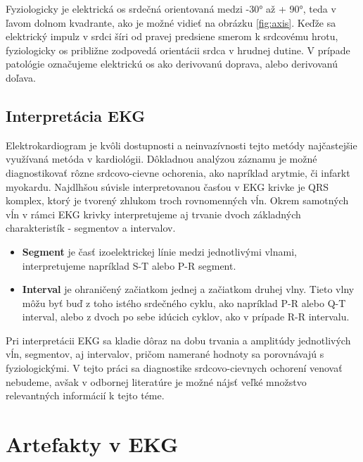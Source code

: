 Fyziologicky je elektrická os srdečná orientovaná medzi -30° až + 90°, teda v ľavom dolnom kvadrante, ako je možné vidieť na obrázku \ref{fig:axis}. Keďže sa elektrický impulz v srdci šíri od pravej predsiene smerom k srdcovému hrotu, fyziologicky os približne zodpovedá orientácii srdca v hrudnej dutine.\cite{Bada2010} V prípade patológie označujeme elektrickú os ako derivovanú doprava, alebo derivovanú doľava.

\subsection{Interpretácia EKG}

Elektrokardiogram je kvôli dostupnosti a neinvazívnosti tejto metódy najčastejšie využívaná metóda v kardiológii. Dôkladnou analýzou záznamu je možné diagnostikovať rôzne srdcovo-cievne ochorenia, ako napríklad arytmie, či infarkt myokardu. Najdlhšou súvisle interpretovanou časťou v EKG krivke je QRS komplex, ktorý je tvorený zhlukom troch rovnomenných vĺn. Okrem samotných vĺn v rámci EKG krivky interpretujeme aj trvanie dvoch základných charakteristík - segmentov a intervalov.
\begin{itemize}
    \item \textbf{Segment} je časť izoelektrickej línie medzi jednotlivými vlnami, interpretujeme napríklad S-T alebo P-R segment.
    \item \textbf{Interval} je ohraničený začiatkom jednej a začiatkom druhej vlny. Tieto vlny môžu byť buď z toho istého srdečného cyklu, ako napríklad P-R alebo Q-T interval, alebo z dvoch po sebe idúcich cyklov, ako v prípade R-R intervalu.\cite{Wasilewski2011}
\end{itemize}

Pri interpretácii EKG sa kladie dôraz na dobu trvania a amplitúdy jednotlivých vĺn, segmentov, aj intervalov, pričom namerané hodnoty sa porovnávajú s fyziologickými. V tejto práci sa diagnostike srdcovo-cievnych ochorení venovať nebudeme, avšak v odbornej literatúre je možné nájsť veľké množstvo relevantných informácií k tejto téme.\cite{Wasilewski2011}\cite{Bada2010}\cite{Foster_2007}


\section{Artefakty v EKG}

